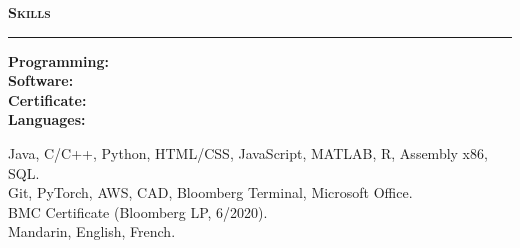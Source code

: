 \documentclass[10pt, letterpaper]{article}
\begin{document}
{\large \textbf{\textsc{Skills}}}
\vspace{5pt}
\hrule
{}
\begin{paracol}{2}
\raggedleft
\textbf{Programming:}\\
\textbf{Software:}\\
\textbf{Certificate:}\\
\textbf{Languages:}\\
\switchcolumn
\raggedright
Java, C/C++, Python, HTML/CSS, JavaScript, MATLAB, R, Assembly x86, SQL.\\
Git, PyTorch, AWS, CAD, Bloomberg Terminal, Microsoft Office. \\


BMC Certificate (Bloomberg LP, 6/2020).\\
Mandarin, English, French.\\
\end{paracol}
\vspace{2mm}
\end{document}
